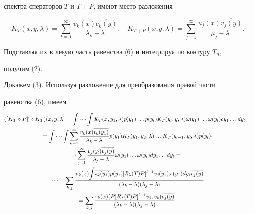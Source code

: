 спектра операторов $T$ и $T+P$, имеют место разложения


$$


K_T(x,y,\lambda)=\sum_{k=1}^\infty\frac{v_k(x)\overline{v_k(y)}}


{\lambda_k-\lambda},


\quad K_{T+P}(x,y,\lambda)=\sum_{j=1}^\infty


\frac{u_j(x)\overline{u_j(y)}}{\mu_j-\lambda}.


$$


Подставляя их в левую часть равенства (6) и интегрируя по контуру $T_n$,


получим (2).





Докажем (3). Используя разложение для преобразования правой части


равенства (6), имеем


\begin{multline}


([K_T\circ P]^l\circ K_T)(x,y,\lambda)=


\idotsint K_T(x,y_1,\lambda)p(y_1)\dotsc


p(y_l)K_T(y_l,y,\lambda)\omega(y_1)\dotsc\omega(y_l) dy_1\dotsc dy_l= \\


%


=\idotsint \sum_{k=1}^\infty\frac{v_k(x)\overline{v_k(y_1)}}


{\lambda_k-\lambda}p(y_1)K_T(y_1,y_2,\lambda)\dotsc


K_T(y_{l-1},y_l,\lambda)p(y_l)\cdot \\


\cdot\sum_{j=1}^\infty


\frac{v_j(y_l)\overline{v_j(y)}}{\lambda_j-\lambda}


\omega(y_1)\dotsc\omega(y_l) dy_1\dots dy_l= \\


%


=\dotsb=\sum_{k,j}\frac{v_k(x){\displaystyle \int}


\overline{v_k(y_1)}p(y_1)[R_\lambda(T)P]^{l-1}v_j(y_1)\omega(y_1)dy_1


\overline{v_j(y)}}


{(\lambda_k-\lambda)(\lambda_j-\lambda)}= \\


%


=\sum_{k,j}\frac{v_k(x)(P[R_\lambda(T)P]^{l-1}v_j,v_k)\overline{v_j(y)}}


{(\lambda_k-\lambda)(\lambda_j-\lambda)}.


\end{multline}


